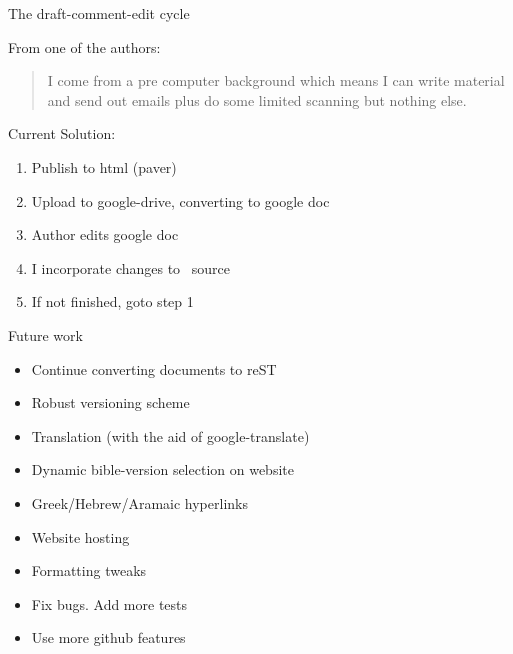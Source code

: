 \documentclass{beamer}
\begin{document}
\begin{frame}[fragile]{The draft-comment-edit cycle}

From one of the authors:

\begin{quote}
I come from a pre computer background which means I can write material and
send out emails plus do some limited scanning but nothing else.
\end{quote}


Current Solution:

\begin{enumerate}
\item Publish to html (paver)
\item Upload to google-drive, converting to google doc
\item Author edits google doc
\item I incorporate changes to \rst\ source 
\item If not finished, goto step 1
\end{enumerate}


\end{frame}


\begin{frame}{Future work}
\begin{itemize}
\item Continue converting documents to reST
\item Robust versioning scheme
\item Translation (with the aid of google-translate)
\item Dynamic bible-version selection on website
\item Greek/Hebrew/Aramaic hyperlinks
\item Website hosting
\item Formatting tweaks
\item Fix bugs. Add more tests
\item Use more github features
\end{itemize}

\end{frame}
\end{document}
